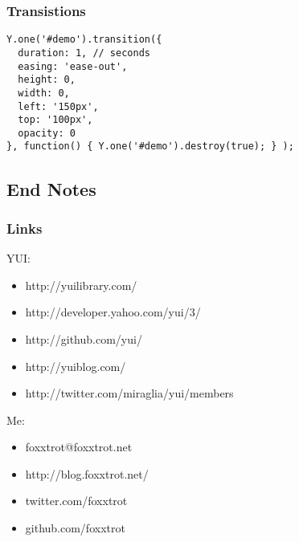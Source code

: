 \documentclass[t]{beamer}
\begin{document}
\begin{frame}[fragile]
 \frametitle{Transistions}
\begin{verbatim}
Y.one('#demo').transition({
  duration: 1, // seconds
  easing: 'ease-out',
  height: 0,
  width: 0,
  left: '150px',
  top: '100px',
  opacity: 0
}, function() { Y.one('#demo').destroy(true); } );
\end{verbatim}
\end{frame}

\subsection{End Notes}
\begin{frame}
 \frametitle{Links}
 YUI:
 \begin{itemize}
  \item http://yuilibrary.com/
  \item http://developer.yahoo.com/yui/3/
  \item http://github.com/yui/
  \item http://yuiblog.com/
  \item http://twitter.com/miraglia/yui/members
 \end{itemize}

 Me:
 \begin{itemize}
  \item foxxtrot@foxxtrot.net
  \item http://blog.foxxtrot.net/
  \item twitter.com/foxxtrot
  \item github.com/foxxtrot
 \end{itemize}
\end{frame}
\end{document}
